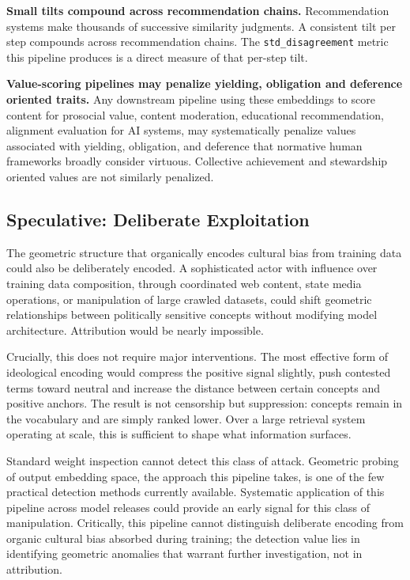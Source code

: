\documentclass[11pt, letterpaper]{article}
\begin{document}
\textbf{Small tilts compound across recommendation chains.} Recommendation systems make thousands of successive similarity judgments. A consistent tilt per step compounds across recommendation chains. The \texttt{std\_disagreement} metric this pipeline produces is a direct measure of that per-step tilt.

\textbf{Value-scoring pipelines may penalize yielding, obligation and deference oriented traits.} Any downstream pipeline using these embeddings to score content for prosocial value, content moderation, educational recommendation, alignment evaluation for AI systems, may systematically penalize values associated with yielding, obligation, and deference that normative human frameworks broadly consider virtuous. Collective achievement and stewardship oriented values are not similarly penalized.

\subsection{Speculative: Deliberate Exploitation}

The geometric structure that organically encodes cultural bias from training data could also be deliberately encoded. A sophisticated actor with influence over training data composition, through coordinated web content, state media operations, or manipulation of large crawled datasets, could shift geometric relationships between politically sensitive concepts without modifying model architecture. Attribution would be nearly impossible.

Crucially, this does not require major interventions. The most effective form of ideological encoding would compress the positive signal slightly, push contested terms toward neutral and increase the distance between certain concepts and positive anchors. The result is not censorship but suppression: concepts remain in the vocabulary and are simply ranked lower. Over a large retrieval system operating at scale, this is sufficient to shape what information surfaces.

Standard weight inspection cannot detect this class of attack. Geometric probing of output embedding space, the approach this pipeline takes, is one of the few practical detection methods currently available. Systematic application of this pipeline across model releases could provide an early signal for this class of manipulation. Critically, this pipeline cannot distinguish deliberate encoding from organic cultural bias absorbed during training; the detection value lies in identifying geometric anomalies that warrant further investigation, not in attribution.
\end{document}
